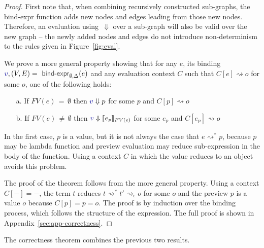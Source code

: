 \documentclass[acmsmall,anonymous,fleqn]{acmart}\settopmatter{printfolios=false,printccs=false,printacmref=false}
\theoremstyle{plain}
\theoremstyle{definition}
\newcommand{\ident}[1]{\textnormal{\textcolor{idclr}{\sffamily #1}}}
\newcommand{\bndclr}[1]{\textcolor{kvdclr}{#1}}
\begin{document}
\begin{proof}
First note that, when combining recursively constructed sub-graphs, the \ident{bind-expr} function
adds new nodes and edges leading from those new nodes. Therefore, an evaluation using~$\Downarrow$
over a sub-graph will also be valid over the new graph -- the newly added nodes and edges do not introduce
non-determinism to the rules given in Figure~\ref{fig:eval}.

We prove a more general property showing that for any $e$, its binding
$\bndclr{v}, (V, E) = \ident{bind-expr}_{\emptyset, \Delta}(e)$ and any evaluation context $C$
such that $C[e]\rightsquigarrow o$ for some $o$, one of the following holds:
%
\begin{enumerate}
\item[a.] If $FV(e)\,=\,\emptyset$ then $\bndclr{v} \Downarrow p$ for some $p$ and $C[p] \rightsquigarrow o$
\item[b.] If $FV(e)\,\neq\,\emptyset$ then $\bndclr{v} \Downarrow \llbracket e_p \rrbracket_{FV(e)}$ for some $e_p$ and $C[e_p] \rightsquigarrow o$
\end{enumerate}
%
In the first case, $p$ is a value, but it is not always the case that $e \rightsquigarrow^{*} p$,
because $p$ may be lambda function and preview evaluation may reduce sub-expression in the body of
the function. Using a context $C$ in which the value reduces to an object avoids this problem.

The proof of the theorem follows from the more general property. Using a context $C[-]=-$, the
term $t$ reduces $t \rightsquigarrow^{*}t' \rightsquigarrow_\epsilon o$ for some $o$ and the
preview $p$ is a value $o$ because $C[p] = p = o$.
The proof is by induction over the binding process, which follows the structure of the expression.
The full proof is shown in Appendix~\ref{sec:app-correctness}.
\end{proof}

\noindent
The correctness theorem combines the previous two results.
\end{document}
